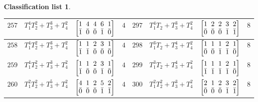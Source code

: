 \documentclass[pdftex]{sigma}%
\theoremstyle{definition}
\newtheorem{class-list}[thm]{Classification list}
\numberwithin{equation}{section}
\begin{document}
\begin{class-list}
\begin{table}[h!]
\begin{tabu}{c|c|c|c||c|c|c|c}
\\
\hline
${257}$&${T_{1}^{4}T_{2}^{2}+T_{3}^{3}+T_{4}^{2}}$
&$\arraycolsep=1mm\begin{bmatrix}{1} & {4} & {4} & {6} & {1} \\ {\bar{1}} & {\bar{0}} & {\bar{0}} & {\bar{1}} & {\bar{0}}\end{bmatrix}$&${4}$
&${297}$&${T_{1}^{4}T_{2}+T_{3}^{3}+T_{4}^{2}}$
&$\arraycolsep=1mm\begin{bmatrix}{1} & {2} & {2} & {3} & {2} \\ {\bar{0}} & {\bar{0}} & {\bar{0}} & {\bar{1}} & {\bar{1}}\end{bmatrix}$&${8}$
\\
\hline
${258}$&${T_{1}^{4}T_{2}^{2}+T_{3}^{3}+T_{4}^{2}}$
&$\arraycolsep=1mm\begin{bmatrix}{1} & {1} & {2} & {3} & {1} \\ {\bar{1}} & {\bar{1}} & {\bar{0}} & {\bar{0}} & {\bar{0}}\end{bmatrix}$&${4}$
&${298}$&${T_{1}^{3}T_{2}+T_{3}^{4}+T_{4}^{2}}$
&$\arraycolsep=1mm\begin{bmatrix}{1} & {1} & {1} & {2} & {1} \\ {\bar{0}} & {\bar{0}} & {\bar{1}} & {\bar{1}} & {\bar{0}}\end{bmatrix}$&${8}$
\\
\hline
${259}$&${T_{1}^{4}T_{2}^{2}+T_{3}^{3}+T_{4}^{2}}$
&$\arraycolsep=1mm\begin{bmatrix}{1} & {1} & {2} & {3} & {1} \\ {\bar{1}} & {\bar{0}} & {\bar{0}} & {\bar{1}} & {\bar{0}}\end{bmatrix}$&${4}$
&${299}$&${T_{1}^{3}T_{2}+T_{3}^{4}+T_{4}^{2}}$
&$\arraycolsep=1mm\begin{bmatrix}{1} & {1} & {1} & {2} & {1} \\ {\bar{1}} & {\bar{1}} & {\bar{1}} & {\bar{1}} & {\bar{0}}\end{bmatrix}$&${8}$
\\
\hline
${260}$&${T_{1}^{2}T_{2}^{2}+T_{3}^{5}+T_{4}^{2}}$
&$\arraycolsep=1mm\begin{bmatrix}{4} & {1} & {2} & {5} & {2} \\ {\bar{0}} & {\bar{0}} & {\bar{0}} & {\bar{1}} & {\bar{1}}\end{bmatrix}$&${4}$
&${300}$&${T_{1}^{2}T_{2}^{2}+T_{3}^{3}+T_{4}^{2}}$
&$\arraycolsep=1mm\begin{bmatrix}{2} & {1} & {2} & {3} & {2} \\ {\bar{0}} & {\bar{0}} & {\bar{0}} & {\bar{1}} & {\bar{1}}\end{bmatrix}$&${8}$

\end{tabu}
\end{table}
\end{class-list}
\end{document}
